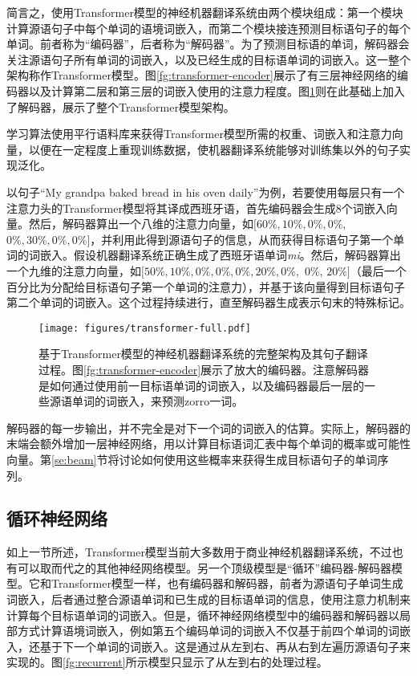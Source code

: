 \documentclass[output=paper,colorlinks,citecolor=brown]{langscibook}
\begin{document}
简言之，使用Transformer模型的神经机器翻译系统由两个模块组成：第一个模块计算源语句子中每个单词的语境词嵌入，而第二个模块接连预测目标语句子的每个单词。前者称为“编码器”，后者称为“解码器”。为了预测目标语的单词，解码器会关注源语句子所有单词的词嵌入，以及已经生成的目标语单词的词嵌入。这一整个架构称作Transformer模型\citep{transformer}。图\ref{fg:transformer-encoder}展示了有三层神经网络的编码器以及计算第二层和第三层的词嵌入使用的注意力程度。图\ref{fg:transformer}则在此基础上加入了解码器，展示了整个Transformer模型架构。

学习算法使用平行语料库来获得Transformer模型所需的权重、词嵌入和注意力向量，以便在一定程度上重现训练数据，使机器翻译系统能够对训练集以外的句子实现泛化。

以句子“My grandpa baked bread in his oven daily”为例，若要使用每层只有一个注意力头的Transformer模型将其译成西班牙语，首先编码器会生成8个词嵌入向量。然后，解码器算出一个八维的注意力向量，如$[60\%, 10\%, 0\%, 0\%,$ $0\%, 30\%, 0\%, 0\%]$，并利用此得到源语句子的信息，从而获得目标语句子第一个单词的词嵌入。假设机器翻译系统正确生成了西班牙语单词\emph{mi}。然后，解码器算出一个九维的注意力向量，如$[50\%, 10\%, 0\%, 0\%, 0\%, 20\%, 0\%,$ 0\%, $20\%]$（最后一个百分比为分配给目标语句子第一个单词的注意力），并基于该向量得到目标语句子第二个单词的词嵌入。这个过程持续进行，直至解码器生成表示句末的特殊标记。


\begin{figure}[tb]
\centering
    \texttt{[image: figures/transformer-full.pdf]}
\caption{基于Transformer模型的神经机器翻译系统的完整架构及其句子翻译过程。图\ref{fg:transformer-encoder}展示了放大的编码器。注意解码器是如何通过使用前一目标语单词的词嵌入，以及编码器最后一层的一些源语单词的词嵌入，来预测zorro一词。}
\label{fg:transformer}
\end{figure}

解码器的每一步输出，并不完全是对下一个词的词嵌入的估算。实际上，解码器的末端会额外增加一层神经网络，用以计算目标语词汇表中每个单词的概率或可能性向量。第\ref{se:beam}节将讨论如何使用这些概率来获得生成目标语句子的单词序列。

\subsection{循环神经网络}
\label{se:recurrent}

如上一节所述，Transformer模型当前大多数用于商业神经机器翻译系统，不过也有可以取而代之的其他神经网络模型。另一个顶级模型是“循环”编码器-解码器模型\citep{recurrent}。它和Transformer模型一样，也有编码器和解码器，前者为源语句子单词生成词嵌入，后者通过整合源语单词和已生成的目标语单词的信息，使用注意力机制来计算每个目标语单词的词嵌入。但是，循环神经网络模型中的编码器和解码器以局部方式计算语境词嵌入，例如第五个编码单词的词嵌入不仅基于前四个单词的词嵌入，还基于下一个单词的词嵌入。这是通过从左到右、再从右到左遍历源语句子来实现的。图\ref{fg:recurrent}所示模型只显示了从左到右的处理过程。
\end{document}
